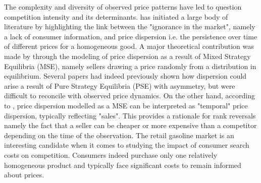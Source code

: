 \documentclass[english]{article}
\begin{document}
The complexity and diversity of observed price patterns have led to question competition intensity and its determinants. \cite{STI61} has initiated a large body of literature by highlighting the link between the "ignorance in the market", namely a lack of consumer information, and price dispersion i.e. the persistence over time of different prices for a homogeneous good. A major theoretical contribution was made by \cite{VAR80} through the modeling of price dispersion as a result of Mixed Strategy Equilibria (MSE), namely sellers drawing a price randomly from a distribution in equilibrium. Several papers had indeed previously shown how dispersion could arise a result of Pure Strategy Equilibria (PSE) with asymmetry, but were difficult to reconcile with observed price dynamics. On the other hand, according to \cite{VAR80}, price dispersion modelled as a MSE can be interpreted as "temporal" price dispersion, typically reflecting "sales". This provides a rationale for rank reversals namely the fact that a seller can be cheaper or more expensive than a competitor depending on the time of the observation. The retail gasoline market is an interesting candidate when it comes to studying the impact of consumer search costs on competition. Consumers indeed purchase only one relatively homogeneous product and typically face significant costs to remain informed about prices.
\end{document}

